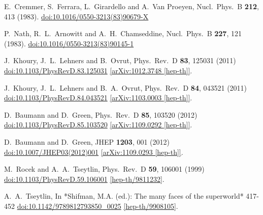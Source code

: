 \documentclass[12pt]{article}
\begin{document}
\begin{thebibliography}{99}
  E.~Cremmer, S.~Ferrara, L.~Girardello and A.~Van Proeyen,
  Nucl.\ Phys.\ B {\bf 212}, 413 (1983).
  \href{https://dx.doi.org/10.1016/0550-3213(83)90679-X}{doi:10.1016/0550-3213(83)90679-X}

  P.~Nath, R.~L.~Arnowitt and A.~H.~Chamseddine,
  Nucl.\ Phys.\ B {\bf 227}, 121 (1983).
  \href{https://dx.doi.org/10.1016/0550-3213(83)90145-1}{doi:10.1016/0550-3213(83)90145-1}

  J.~Khoury, J.~L.~Lehners and B.~Ovrut,
  Phys.\ Rev.\ D {\bf 83}, 125031 (2011)
  \href{https://dx.doi.org/10.1103/PhysRevD.83.125031}{doi:10.1103/PhysRevD.83.125031}
  \href{https://arxiv.org/abs/1012.3748}{[arXiv:1012.3748 [hep-th]]}.

  J.~Khoury, J.~L.~Lehners and B.~A.~Ovrut,
  Phys.\ Rev.\ D {\bf 84}, 043521 (2011)
  \href{https://dx.doi.org/10.1103/PhysRevD.84.043521}{doi:10.1103/PhysRevD.84.043521}
  \href{https://arxiv.org/abs/1103.0003}{[arXiv:1103.0003 [hep-th]]}.

  D.~Baumann and D.~Green,
  Phys.\ Rev.\ D {\bf 85}, 103520 (2012)
  \href{https://dx.doi.org/10.1103/PhysRevD.85.103520}{doi:10.1103/PhysRevD.85.103520}
  \href{https://arxiv.org/abs/1109.0292}{[arXiv:1109.0292 [hep-th]]}.

  D.~Baumann and D.~Green,
  JHEP {\bf 1203}, 001 (2012)
  \href{https://dx.doi.org/10.1007/JHEP03(2012)001}{doi:10.1007/JHEP03(2012)001}
  \href{https://arxiv.org/abs/1109.0293}{[arXiv:1109.0293 [hep-th]]}.

  M.~Rocek and A.~A.~Tseytlin,
  Phys.\ Rev.\ D {\bf 59}, 106001 (1999)
  \href{https://dx.doi.org/10.1103/PhysRevD.59.106001}{doi:10.1103/PhysRevD.59.106001}
  \href{https://arxiv.org/abs/hep-th/9811232}{[hep-th/9811232]}.

  A.~A.~Tseytlin,
  In *Shifman, M.A. (ed.): The many faces of the superworld* 417-452
  \href{https://dx.doi.org/10.1142/9789812793850\_0025}{doi:10.1142/9789812793850\_0025}
  \href{https://arxiv.org/abs/hep-th/9908105}{[hep-th/9908105]}.


\end{thebibliography}
\end{document}
